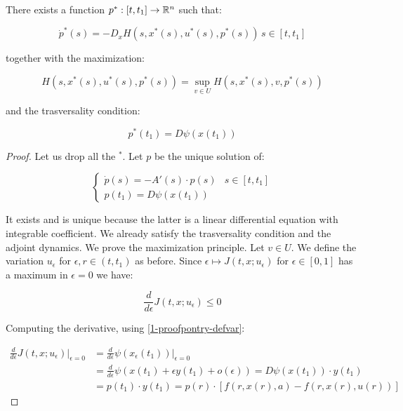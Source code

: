 \begin{theorem}\label{1-proofpontry-theo}
    There exists a function $p^{\ast}:[t,t_1]\rightarrow \mathbb{R}^n$ such that:

    \begin{equation}
        \dot{p}^{\ast}(s) = -D_x H(s,x^{\ast}(s),u^{\ast}(s),p^{\ast}(s))\, s\in[t,t_1]
    \end{equation}

    together with the maximization:

    \begin{equation}
        H(s,x^{\ast}(s),u^{\ast}(s),p^{\ast}(s)) = \sup_{v\in U} H(s,x^{\ast}(s),v,p^{\ast}(s))
    \end{equation}

    and the trasversality condition:

    \begin{equation}
        p^{\ast}(t_1) = D\psi(x(t_1))
    \end{equation}

    \begin{proof}
        Let us drop all the $^{\ast}$. Let $p$ be the unique solution of:

        \begin{equation}
            \begin{cases}
                \dot{p}(s) = - A'(s)\cdot p(s) & s\in[t,t_1] \\
                p(t_1) = D\psi(x(t_1))
            \end{cases}
        \end{equation}

        It exists and is unique because the latter is a linear differential equation with integrable coefficient. 
        We already satisfy the trasversality condition and the adjoint dynamics. We prove the 
        maximization principle. Let $v\in U$. We define the variation $u_{\epsilon}$ for $\epsilon,r\in(t,t_1)$ as before.
        Since $\epsilon\mapsto  J(t,x;u_{\epsilon})$ for $\epsilon\in[0,1]$ has a maximum in $\epsilon=0$ we have:
        
        \begin{equation}\label{1-proofpontry-dervar0}
            \frac{d}{d\epsilon}J(t,x;u_{\epsilon})\leq0
        \end{equation}

        Computing the derivative, using \ref{1-proofpontry-defvar}:

        \begin{align}
            \frac{d}{d\epsilon}J(t,x;u_{\epsilon})\big|_{\epsilon=0} & = \frac{d}{d\epsilon}\psi(x_{\epsilon}(t_1))\big|_{\epsilon=0} \\
            & = \frac{d}{d\epsilon}\psi(x(t_1) + \epsilon y(t_1) + o(\epsilon)) = D\psi(x(t_1))\cdot y(t_1) \\
            & = p(t_1)\cdot y(t_1) = p(r)\cdot[f(r,x(r),a)-f(r,x(r),u(r))]
        \end{align}


\end{proof}
\end{theorem}

